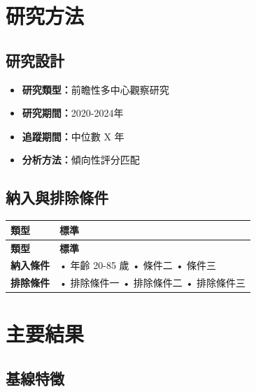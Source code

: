 \documentclass[12pt,a4paper]{article}
\begin{document}
\section{研究方法}

\subsection{研究設計}

\begin{itemize}
    \item \textbf{研究類型：}前瞻性多中心觀察研究
    \item \textbf{研究期間：}2020-2024年
    \item \textbf{追蹤期間：}中位數 X 年
    \item \textbf{分析方法：}傾向性評分匹配
\end{itemize}

\subsection{納入與排除條件}

\begin{longtable}{p{3cm}p{11cm}}
\toprule
\textbf{類型} & \textbf{標準} \\
\midrule
\endfirsthead

\toprule
\textbf{類型} & \textbf{標準} \\
\midrule
\endhead

\bottomrule
\endfoot

\textbf{納入條件} & 
• 年齡 20-85 歲\newline
• 條件二\newline
• 條件三 \\
\midrule
\textbf{排除條件} & 
• 排除條件一\newline
• 排除條件二\newline
• 排除條件三 \\
\bottomrule
\end{longtable}

\section{主要結果}

\subsection{基線特徵}
\end{document}
